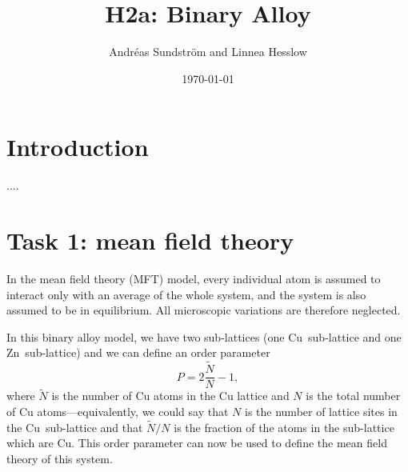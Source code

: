 
\usepackage{units}
\usepackage{physics}

\newcommand{\ee}{\mathrm{e}}
\newcommand{\ii}{\mathrm{i}}
\newcommand{\kB}{k_\mathrm{B}}
\newcommand{\MFT}{\text{MFT}}

\title{H2a: Binary Alloy}
\author{Andr\'eas Sundstr\"om and Linnea Hesslow}
\date{\today}





\section*{Introduction}

....

\section*{Task 1: mean field theory}
In the mean field theory (MFT) model, every individual atom is assumed
to interact only with an average of the whole system, and the system
is also assumed to be in equilibrium. All microscopic
variations are therefore neglected.

In this binary alloy model, we have two sub-lattices (one
Cu~sub-lattice and one Zn~sub-lattice) and we can define an order
parameter
\begin{equation}
P=2\frac{\tilde{N}}{N}-1,
\end{equation}
where $\tilde{N}$ is the number of Cu atoms in the Cu lattice and $N$
is the total number of Cu atoms---equivalently, we could say that $N$
is the number of lattice sites in the Cu~sub-lattice and that
$\tilde{N}/N$ is the fraction of the atoms in the sub-lattice which
are Cu. This order parameter can now be used to define the mean field
theory of this system.

